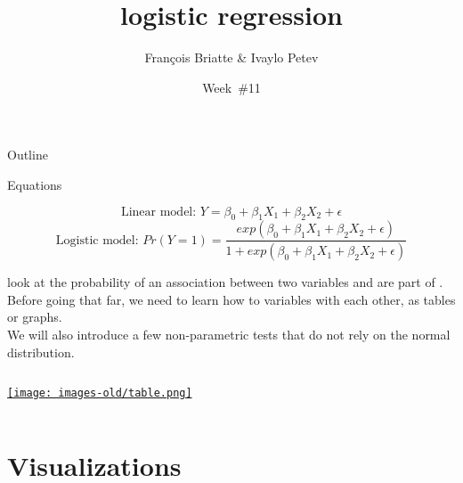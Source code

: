 \documentclass[t]{beamer}
\title{logistic regression}
\author{François Briatte \& Ivaylo Petev}
\date{Week~\#11}
\begin{document}
	
    \frame[plain]{
		\titlepage\\[7em]
		\tableofcontents[hideallsubsections]
		}

	
	\begin{frame}[t]{Outline}
	
	\begin{block}{Equations}
	
	$$\text{Linear model:~} Y = \beta_0 + \beta_1 X_1 + \beta_2 X_2 + \epsilon$$
	$$\text{Logistic model:~} Pr(Y=1) = \frac{exp(\beta_0 + \beta_1 X_1 + \beta_2 X_2 + \epsilon)}{1+exp(\beta_0 + \beta_1 X_1 + \beta_2 X_2 + \epsilon)}$$
	\end{block}
		
	 look at the probability of an association between two variables and are part of .\\[.5em]
	
	Before going that far, we need to learn how to  variables with each other, as tables or graphs.\\[.5em]
	
	We will also introduce a few non-parametric tests that do not rely on the normal distribution.\\[.5em]
	
		\begin{columns}[T]
			\tableofcontents[hideallsubsections]
			\begin{center}
				\href{http://ideas.repec.org/c/boc/bocode/s447101.html}{\texttt{[image: images-old/table.png]}}
			\end{center}		
		\end{columns}
		\vspace{2em}
	\end{frame}
		
	\section{Visualizations}
\end{document}
